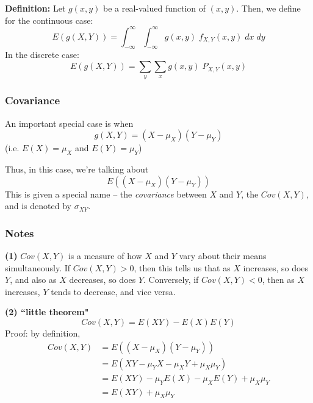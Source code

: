 \documentclass[12pt]{article}
\begin{document}
\textbf{Definition:} Let $g(x,y)$ be a real-valued function of $(x,y)$. Then, we define for the continuous case:
\[
    E(g(X,Y)) = \int_{-\infty}^{\infty} \int_{-\infty}^{\infty} g(x,y) \; f_{X,Y} (x,y) \; dx \; dy
\]
In the discrete case:
\[
    E(g(X,Y)) = \sum_y \sum_x g(x,y) \; P_{X,Y} (x,y)
\]

\subsubsection{Covariance}
An important special case is when 
\[
    g(X,Y) = (X - \mu_X)(Y - \mu_Y)
\]
(i.e. $E(X) = \mu_X$ and $E(Y) = \mu_Y$)

Thus, in this case, we're talking about
\[
    E((X - \mu_X)(Y - \mu_Y))
\]
This is given a special name -- the \emph{covariance} between $X$ and $Y$, the $Cov(X,Y)$, and is denoted by $\sigma_{XY}$.

\subsubsection{Notes}
\textbf{(1)} $Cov(X,Y)$ is a measure of how $X$ and $Y$ vary about their means simultaneously. If $Cov(X,Y) > 0$, then this tells us that as $X$ increases, so does $Y$, and also as $X$ decreases, so does $Y$. Conversely, if $Cov(X,Y) < 0$, then as $X$ increases, $Y$ tends to decrease, and vice versa.

\textbf{(2) ``little theorem"} 
\[
    Cov(X,Y) = E(XY) - E(X) E(Y)
\]
Proof: by definition, 
\begin{align*}
    Cov(X,Y) &= E((X - \mu_X)(Y - \mu_Y)) \\
        &= E(XY - \mu_Y X - \mu_X Y + \mu_X \mu_Y) \\
        &= E(XY) - \mu_Y E(X) - \mu_X E(Y) + \mu_X \mu_Y \\
        &= E(XY) + \mu_X \mu_Y
\end{align*}
\end{document}
